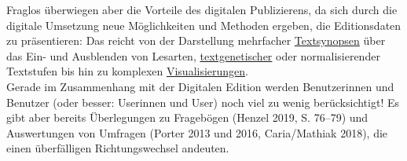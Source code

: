 \documentclass{article}
\begin{document}
        Fraglos überwiegen aber die Vorteile des digitalen Publizierens, da sich durch die digitale Umsetzung neue Möglichkeiten und Methoden ergeben, die Editionsdaten zu präsentieren: Das reicht von der Darstellung mehrfacher \href{http://gams.uni-graz.at/o:konde.174}{Textsynopsen} über das  Ein- und Ausblenden von Lesarten, \href{http://gams.uni-graz.at/o:konde.28}{textgenetischer} oder normalisierender Textstufen bis hin zu komplexen \href{http://gams.uni-graz.at/o:konde.54}{Visualisierungen}.\\
            
        Gerade im Zusammenhang mit der Digitalen Edition werden Benutzerinnen und Benutzer (oder besser: Userinnen und User) noch viel zu wenig berücksichtigt! Es gibt aber bereits Überlegungen zu Fragebögen (Henzel 2019, S. 76–79) und Auswertungen von Umfragen (Porter 2013 und 2016, Caria/Mathiak 2018), die einen überfälligen Richtungswechsel andeuten.\\
            
\end{document}
